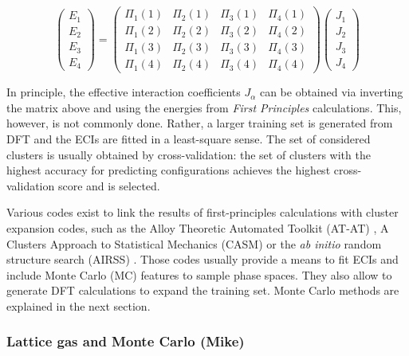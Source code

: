 \documentclass[../main.tex]{subfiles}
\begin{document}
\begin{equation}
{\left( \begin{array}{cccc}
{E_1}\\
{E_2}\\
{E_3}\\
{E_4}
\end{array}\right)}=
{\left( \begin{array}{cccc}
{\Pi_1}(1) & {\Pi_2}(1) & {\Pi_3}(1) & {\Pi_4}(1) \\
{\Pi_1}(2) & {\Pi_2}(2) & {\Pi_3}(2) & {\Pi_4}(2)  \\
{\Pi_1}(3) & {\Pi_2}(3) & {\Pi_3}(3) & {\Pi_4}(3)  \\
{\Pi_1}(4) & {\Pi_2}(4) & {\Pi_3}(4) & {\Pi_4}(4) 
\end{array}\right)}
{\left(\begin{array}{cccc}
{J_1}\\
{J_2}\\
{J_3}\\
{J_4}
\end{array}\right)}
\end{equation}

In principle, the effective interaction coefficients $J_\alpha$ can be obtained via inverting the matrix above and using the energies from \textit{First Principles} calculations. This, however, is not commonly done. Rather, a larger training set is generated from DFT and the ECIs are fitted in a least-square sense. The set of considered clusters is usually obtained by cross-validation: the set of clusters with the highest accuracy for predicting configurations achieves the highest cross-validation score and is selected.

Various codes exist to link the results of first-principles calculations with cluster expansion codes, such as the Alloy Theoretic Automated Toolkit (AT-AT) \cite{avdw:atat2,avdw:atat,VandeWalle2002},  A Clusters Approach to Statistical Mechanics (CASM) \cite{natarajan2017} or the \textit{ab initio} random structure search (AIRSS) \cite{Pickard_2011}. Those codes usually provide a means to fit ECIs and include Monte Carlo (MC) features to sample phase spaces. They also allow to generate DFT calculations to expand the training set. Monte Carlo methods are explained in the next section.

\subsubsection{Lattice gas and Monte Carlo (Mike)}
\label{sec:monte_carlo}
\end{document}
